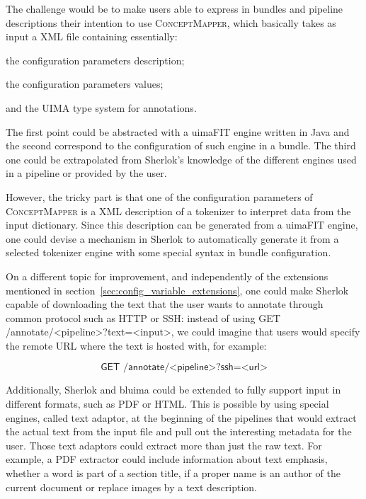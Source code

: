 \documentclass{article}
\newcommand{\ID}[1]{{\textsc{#1}}}
\newcommand{\REST}[1]{\textsf{#1}}
\begin{document}
The challenge would be to make users able to express in bundles and pipeline descriptions their
intention to use \ID{ConceptMapper}, which basically takes as input a XML file containing
essentially:
\begin{enumerate*}[label=\itshape\alph*\upshape)]

    \item the configuration parameters description;

    \item the configuration parameters values;

    \item and the UIMA type system for annotations.

\end{enumerate*}
The first point could be abstracted with a uimaFIT engine written in Java and the second correspond
to the configuration of such engine in a bundle. The third one could be extrapolated from Sherlok's
knowledge of the different engines used in a pipeline or provided by the user.

However, the tricky part is that one of the configuration parameters of \ID{ConceptMapper} is a XML
description of a tokenizer to interpret data from the input dictionary. Since this description can
be generated from a uimaFIT engine, one could devise a mechanism in Sherlok to automatically
generate it from a selected tokenizer engine with some special syntax in bundle configuration.

On a different topic for improvement, and independently of the extensions mentioned in
section~\ref{sec:config_variable_extensions}, one could make Sherlok capable of downloading the text
that the user wants to annotate through common protocol such as HTTP or SSH: instead of using
\REST{GET /annotate/<pipeline>?text=<input>}, we could imagine that users would specify the remote
URL where the text is hosted with, for example:

\[
    \REST{GET /annotate/<pipeline>?ssh=<url>}
\]

Additionally, Sherlok and bluima could be extended to fully support input in different formats, such
as PDF or HTML. This is possible by using special engines, called text adaptor, at the beginning of
the pipelines that would extract the actual text from the input file and pull out the interesting
metadata for the user. Those text adaptors could extract more than just the raw text. For example, a
PDF extractor could include information about text emphasis, whether a word is part of a section
title, if a proper name is an author of the current document or replace images by a text
description.
\end{document}
